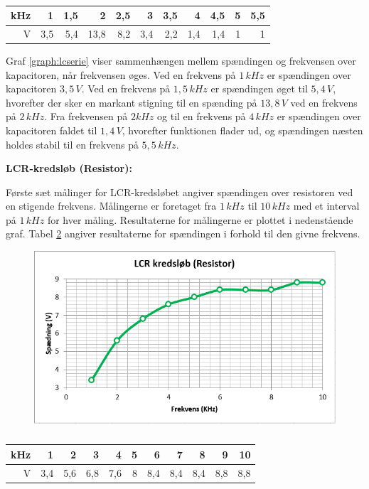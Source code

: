 \begin{table}[H]
\centering
\begin{tabular}{|r|r|r|r|r|r|r|r|r|r|r|} \hline
kHz & 1 & 1,5 & 2 & 2,5 & 3 & 3,5 & 4 & 4,5 & 5 & 5,5 \\ \hline
V & 3,5 & 5,4 & 13,8 & 8,2 & 3,4 & 2,2 & 1,4 & 1,4 & 1 & 1 \\ \hline
\end{tabular}
\caption{}
\label{tabular:lcserie}
\end{table}

Graf \ref{graph:lcserie} viser sammenhængen mellem spændingen og frekvensen over kapacitoren, når frekvensen øges. Ved en frekvens på $1\, kHz$ er spændingen over kapacitoren $3,5\, V$. Ved en frekvens på $1,5\, kHz$ er spændingen øget til $5,4\, V$, hvorefter der sker en markant stigning til en spænding på $13,8\, V$ ved en frekvens på $2\, kHz$. Fra frekvensen på $2 kHz$ og til en frekvens på $4\, kHz$ er spændingen over kapacitoren faldet til $1,4\, V$, hvorefter funktionen flader ud, og spændingen næsten holdes stabil til en frekvens på $5,5\, kHz$.

\textbf{LCR-kredsløb (Resistor):}

Første sæt målinger for LCR-kredsløbet angiver spændingen over resistoren ved en stigende frekvens. Målingerne er foretaget fra $1\, kHz$ til $10\, kHz$ med et interval på $1\, kHz$ for hver måling. Resultaterne for målingerne er plottet i nedenstående graf. Tabel \ref{tabular:lcrmodstand} angiver resultaterne for spændingen i forhold til den givne frekvens.

\begin{figure}[H]
\includegraphics[scale=1]{Setup/Graf7}
\caption{}
\label{graph:lcrmodstand}
\end{figure}

\begin{table}[H]
\centering
\begin{tabular}{|r|r|r|r|r|r|r|r|r|r|r|} \hline
kHz & 1 & 2 & 3 & 4 & 5 & 6 & 7 & 8 & 9 & 10 \\ \hline
V & 3,4 & 5,6 & 6,8 & 7,6 & 8 & 8,4 & 8,4 & 8,4 & 8,8 & 8,8 \\ \hline
\end{tabular}
\caption{}
\label{tabular:lcrmodstand}
\end{table}

